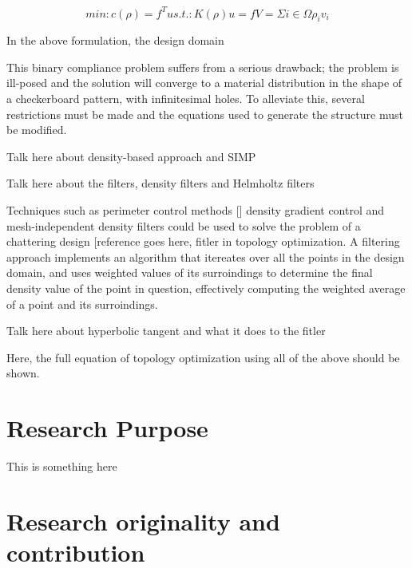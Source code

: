 \documentclass[../main.tex]{subfiles}
\begin{document}
\begin{equation}
  \label{eq:topopt_eq}
  min: c(\rho) = f^T u 
  s.t. : K(\rho)u = f 
  V = \Sigma i \in \Omega \rho_i v_i
\end{equation}

In the above formulation, the design domain 

This binary compliance problem suffers from a serious drawback; the problem is ill-posed and the solution will converge to a material distribution in the shape of a checkerboard pattern, with infinitesimal holes. To alleviate this, several restrictions must be made  and the equations used to generate the structure must be modified. 

Talk here about density-based approach and SIMP 

Talk here about the filters, density filters and Helmholtz filters

Techniques such as perimeter control methods [] density gradient control 
and mesh-independent density filters could be used to solve the problem of a chattering design [reference goes here, fitler in topology optimization. A filtering approach implements an algorithm that itereates over all the points in the design domain, and uses weighted values of its surroindings to determine the final density value of the point in question, effectively computing the weighted average of a point and its surroindings.

Talk here about hyperbolic tangent and what it does to the fitler

Here, the full equation of topology optimization using all of the above should be shown.

\section{Research Purpose}
 
This is something here

\section{Research originality and contribution}
\end{document}
